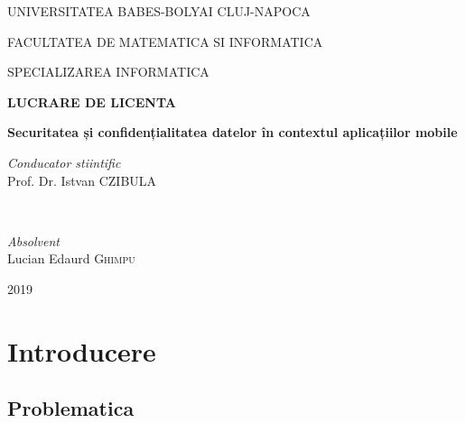 \documentclass[12pt]{article}
\begin{document}
\begin{titlepage}
    \begin{center}
        {\scshape\large UNIVERSITATEA BABES-BOLYAI CLUJ-NAPOCA \par}
        \vspace{0.2cm}
        {\scshape\large FACULTATEA DE MATEMATICA SI INFORMATICA \par}
        \vspace{0.2cm}
        {\scshape\large SPECIALIZAREA INFORMATICA \par}
        \vspace{4.5cm}
        {\LARGE\bfseries LUCRARE DE LICENTA \par}
        \vspace{0.3cm}
        {\LARGE\bfseries Securitatea și confidențialitatea datelor în contextul aplicațiilor mobile\par}
        \vspace{0.5cm}
   \end{center}

\vspace*{\fill}
\begin{minipage}{0.5\textwidth}
\begin{flushleft} \large
\emph{Conducator stiintific}\\
Prof. Dr. Istvan \textsc{CZIBULA} 
\end{flushleft}
\end{minipage}
~
\begin{minipage}{0.4\textwidth}
\begin{flushright} \large
\emph{Absolvent}\\
Lucian Edaurd \textsc{Ghimpu} 
\end{flushright}
\end{minipage}
\vspace{2.0cm}
\begin{center}
{\large 2019}
\end{center}
\end{titlepage}


\tableofcontents

\newpage
\section{Introducere}
\subsection{Problematica}
\end{document}
